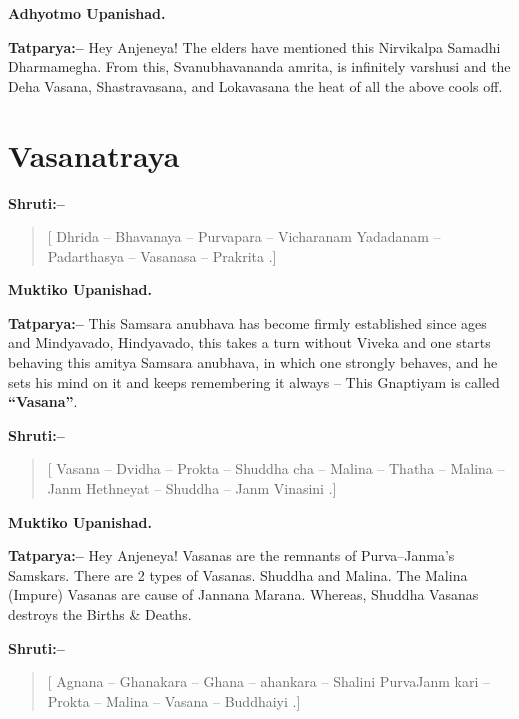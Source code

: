 \begin{flushright}
\textbf{Adhyotmo Upanishad.}
\end{flushright}

\textbf{Tatparya:–} Hey Anjeneya! The elders have mentioned this Nirvikalpa Samadhi Dharmamegha. From this, Svanubhavananda amrita, is infinitely varshusi and the Deha Vasana, Shastravasana, and Lokavasana the heat of all the above cools off.

\chapter{Vasanatraya}

\textbf{Shruti:–}

\begin{verse}
[ Dhrida – Bhavanaya – Purvapara – Vicharanam  Yadadanam – Padarthasya – Vasanasa – Prakrita .]
\end{verse}

\begin{flushright}
\textbf{Muktiko Upanishad.}
\end{flushright}

\textbf{Tatparya:–} This Samsara anubhava has become firmly established since ages and Mindyavado, Hindyavado, this takes a turn without Viveka and one starts behaving this amitya Samsara anubhava, in which one strongly behaves, and he sets his mind on it and keeps remembering it always – This Gnaptiyam is called \textbf{“Vasana”}.

\textbf{Shruti:–}

\begin{verse}
[ Vasana – Dvidha – Prokta – Shuddha cha – Malina – Thatha –  Malina – Janm Hethneyat – Shuddha – Janm Vinasini .]
\end{verse}

\begin{flushright}
\textbf{Muktiko Upanishad.}
\end{flushright}

\textbf{Tatparya:–} Hey Anjeneya! Vasanas are the remnants of Purva–Janma's Samskars. There are 2 types of Vasanas. Shuddha and Malina. The Malina (Impure) Vasanas are cause of Jannana Marana. Whereas, Shuddha Vasanas destroys the Births \& Deaths.

\textbf{Shruti:–}

\begin{verse}
[ Agnana – Ghanakara – Ghana – ahankara – Shalini  PurvaJanm kari – Prokta – Malina – Vasana – Buddhaiyi .]
\end{verse}

